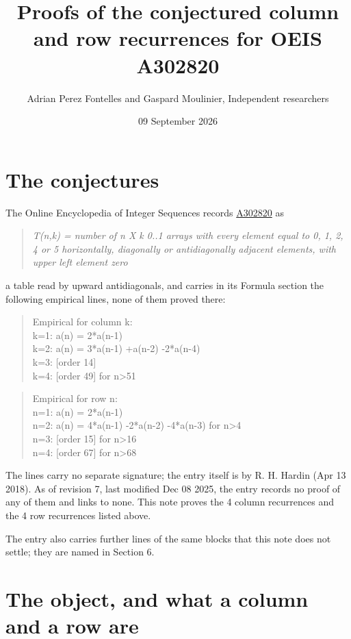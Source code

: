 \documentclass[11pt]{article}
\title{Proofs of the conjectured column and row recurrences for OEIS A302820}
\author{Adrian Perez Fontelles and Gaspard Moulinier, Independent researchers}
\date{09 September 2026}
\theoremstyle{definition}
\begin{document}
\maketitle
\section{The conjectures}

The Online Encyclopedia of Integer Sequences records \href{https://oeis.org/A302820}{A302820} as

\begin{quote}\itshape T(n,k) = number of n X k 0..1 arrays with every element equal to 0, 1, 2, 4 or 5 horizontally, diagonally or antidiagonally adjacent elements, with upper left element zero\end{quote}

a table read by upward antidiagonals, and carries in its Formula section the following empirical lines, none of them proved there:

\begin{quote}\ttfamily Empirical for column k:\\
k=1: a(n) = 2*a(n-1)\\k=2: a(n) = 3*a(n-1) +a(n-2) -2*a(n-4)\\k=3: [order 14]\\k=4: [order 49] for n>51\end{quote}

\begin{quote}\ttfamily Empirical for row n:\\
n=1: a(n) = 2*a(n-1)\\n=2: a(n) = 4*a(n-1) -2*a(n-2) -4*a(n-3) for n>4\\n=3: [order 15] for n>16\\n=4: [order 67] for n>68\end{quote}

The lines carry no separate signature; the entry itself is by R. H. Hardin (Apr 13 2018). As of revision 7, last modified Dec 08 2025, the entry records no proof of any of them and links to none. This note proves the 4 column recurrences and the 4 row recurrences listed above.

The entry also carries further lines of the same blocks that this note does not settle; they are named in Section 6.

\section{The object, and what a column and a row are}
\end{document}
